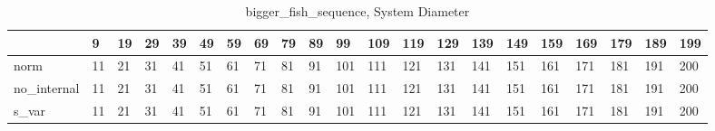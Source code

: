 \begin{table}
\centering
\caption{bigger_fish_sequence, System Diameter}
\label{bigger_fish_sequence_diam}
\begin{tabular}{lllllllllllllllllllll}
\toprule
{} &   9 &  19 &  29 &  39 &  49 &  59 &  69 &  79 &  89 &   99 &  109 &  119 &  129 &  139 &  149 &  159 &  169 &  179 &  189 &  199 \\
\midrule
norm        &  11 &  21 &  31 &  41 &  51 &  61 &  71 &  81 &  91 &  101 &  111 &  121 &  131 &  141 &  151 &  161 &  171 &  181 &  191 &  200 \\
no\_internal &  11 &  21 &  31 &  41 &  51 &  61 &  71 &  81 &  91 &  101 &  111 &  121 &  131 &  141 &  151 &  161 &  171 &  181 &  191 &  200 \\
s\_var       &  11 &  21 &  31 &  41 &  51 &  61 &  71 &  81 &  91 &  101 &  111 &  121 &  131 &  141 &  151 &  161 &  171 &  181 &  191 &  200 \\
\bottomrule
\end{tabular}
\end{table}
